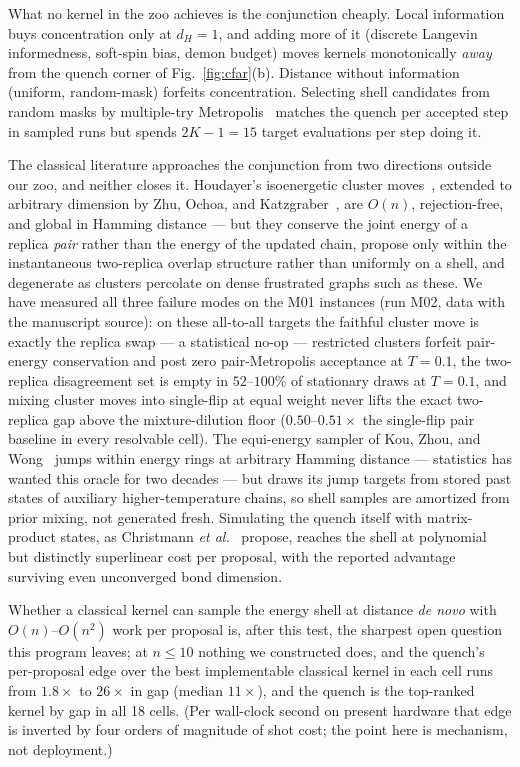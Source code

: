 \documentclass[aps,prx,reprint,floatfix,amsmath,amssymb,amsfonts]{revtex4-2}
\begin{document}
What no kernel in the zoo achieves is the conjunction cheaply. Local
information buys concentration only at $d_H=1$, and adding more of it
(discrete Langevin informedness, soft-spin bias, demon budget) moves
kernels monotonically \emph{away} from the quench corner of
Fig.~\ref{fig:cfar}(b). Distance without information (uniform,
random-mask) forfeits concentration. Selecting shell candidates from
random masks by multiple-try Metropolis~\cite{Liu2000MTM} matches the
quench per accepted step in sampled runs but spends $2K-1=15$ target
evaluations per step doing it.

The classical literature approaches the conjunction from two
directions outside our zoo, and neither closes it. Houdayer's
isoenergetic cluster moves~\cite{Houdayer2001}, extended to arbitrary
dimension by Zhu, Ochoa, and Katzgraber~\cite{Zhu2015ICM}, are
$O(n)$, rejection-free, and global in Hamming distance --- but they
conserve the joint energy of a replica \emph{pair} rather than the
energy of the updated chain, propose only within the instantaneous
two-replica overlap structure rather than uniformly on a shell, and
degenerate as clusters percolate on dense frustrated graphs such as
these. We have measured all three failure modes on the M01 instances
(run M02, data with the manuscript source): on these all-to-all
targets the faithful cluster move is exactly the replica swap --- a
statistical no-op --- restricted clusters forfeit pair-energy
conservation and post zero pair-Metropolis acceptance at $T=0.1$, the
two-replica disagreement set is empty in $52$--$100\%$ of stationary
draws at $T=0.1$, and mixing cluster moves into single-flip at equal
weight never lifts the exact two-replica gap above the
mixture-dilution floor ($0.50$--$0.51\times$ the single-flip pair
baseline in every resolvable cell). The equi-energy sampler of Kou, Zhou, and
Wong~\cite{Kou2006EE} jumps within energy rings at arbitrary Hamming
distance --- statistics has wanted this oracle for two decades --- but
draws its jump targets from stored past states of auxiliary
higher-temperature chains, so shell samples are amortized from prior
mixing, not generated fresh. Simulating the quench itself with
matrix-product states, as Christmann \emph{et
al.}~\cite{Christmann2024} propose, reaches the shell at polynomial
but distinctly superlinear cost per proposal, with the reported
advantage surviving even unconverged bond dimension.

Whether a classical kernel can sample
the energy shell at distance \emph{de novo} with $O(n)$--$O(n^2)$
work per proposal is,
after this test, the sharpest open question this program leaves; at
$n\le 10$ nothing we constructed does, and the quench's per-proposal
edge over the best implementable classical kernel in each cell runs
from $1.8\times$ to $26\times$ in gap (median $11\times$), and the
quench is the top-ranked kernel by gap in all 18 cells. (Per wall-clock second on present hardware that edge
is inverted by four orders of magnitude of shot cost; the point here is
mechanism, not deployment.)
\end{document}
